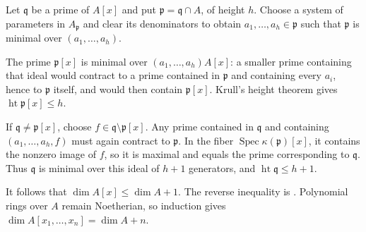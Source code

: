 Let $\mathfrak q$ be a prime of $A[x]$ and put $\mathfrak p=\mathfrak q\cap A$, of height $h$. Choose a system of parameters in $A_{\mathfrak p}$ and clear its denominators to obtain $a_1,\ldots,a_h\in\mathfrak p$ such that $\mathfrak p$ is minimal over $(a_1,\ldots,a_h)$.

The prime $\mathfrak p[x]$ is minimal over $(a_1,\ldots,a_h)A[x]$: a smaller prime containing that ideal would contract to a prime contained in $\mathfrak p$ and containing every $a_i$, hence to $\mathfrak p$ itself, and would then contain $\mathfrak p[x]$. Krull's height theorem gives $\operatorname{ht}\mathfrak p[x]\leq h$.

If $\mathfrak q\neq\mathfrak p[x]$, choose $f\in\mathfrak q\setminus\mathfrak p[x]$. Any prime contained in $\mathfrak q$ and containing $(a_1,\ldots,a_h,f)$ must again contract to $\mathfrak p$. In the fiber $\operatorname{Spec}\kappa(\mathfrak p)[x]$, it contains the nonzero image of $f$, so it is maximal and equals the prime corresponding to $\mathfrak q$. Thus $\mathfrak q$ is minimal over this ideal of $h+1$ generators, and $\operatorname{ht}\mathfrak q\leq h+1$.

It follows that $\dim A[x]\leq\dim A+1$. The reverse inequality is . Polynomial rings over $A$ remain Noetherian, so induction gives $\dim A[x_1,\ldots,x_n]=\dim A+n$.
